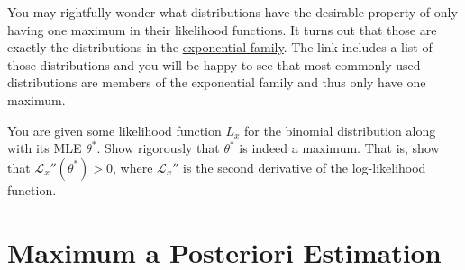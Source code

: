 You may rightfully wonder what distributions have the desirable property of only having one maximum in their likelihood functions. It turns out that those are
exactly the distributions in the \href{https://en.wikipedia.org/wiki/Exponential_family}{exponential family}. The link includes a list of those distributions and
you will be happy to see that most commonly used distributions are members of the exponential family and thus only have one maximum.

\begin{Exercise}
You are given some likelihood function $ L_{x} $ for the binomial distribution along with its MLE $ \theta^{*} $. Show rigorously that $ \theta^{*} $ is indeed
a maximum. That is, show that $ \mathcal{L}_{x}''(\theta^{*}) > 0 $, where $ \mathcal{L}_{x}'' $ is the second derivative of the log-likelihood function.
\end{Exercise}
 
\section{Maximum a Posteriori Estimation}

